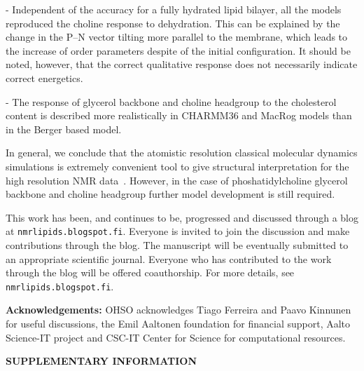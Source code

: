 \documentclass[pre,aps,floatfix,authordate1-4,twocolumn]{revtex4-1}
\begin{document}
- Independent of the accuracy for a fully hydrated lipid bilayer, all the models reproduced the choline response
to dehydration. This can be explained by the change in the P--N vector tilting more parallel to the membrane,
which leads to the increase of order parameters despite of the initial configuration. It should be noted, however,
that the correct qualitative response does not necessarily indicate correct energetics. 

- The response of glycerol backbone and choline headgroup to the cholesterol content is described more
realistically in CHARMM36 and MacRog models than in the Berger based model.

In general, we conclude that the atomistic resolution classical molecular dynamics simulations 
is extremely convenient tool to give structural interpretation for the high resolution NMR data~\cite{ferreira14}. 
However, in the case of phoshatidylcholine glycerol backbone and choline headgroup further model development is still required.

This work has been, and continues to be, progressed and discussed through a blog at \texttt{nmrlipids.blogspot.fi}. 
Everyone is invited to join the discussion and make contributions through the blog. 
The manuscript will be eventually submitted to an appropriate scientific journal. 
Everyone who has contributed to the work through the blog will be offered 
coauthorship. For more details, see \texttt{nmrlipids.blogspot.fi}. 



{\bf Acknowledgements: }
OHSO acknowledges Tiago Ferreira and Paavo Kinnunen for useful discussions, the Emil Aaltonen foundation for financial support, Aalto Science-IT project and CSC-IT Center for Science for computational resources. 




\newpage

\appendix
\begin{center}
{\bf SUPPLEMENTARY INFORMATION}
\end{center}
\end{document}

